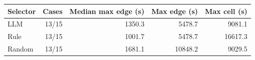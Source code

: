 \begin{tabular}{lrrrr}
\toprule
Selector & Cases & Median max edge (s) & Max edge (s) & Max cell (s) \\
\midrule
LLM & 13/15 & 1350.3 & 5478.7 & 9081.1 \\
Rule & 13/15 & 1001.7 & 5478.7 & 16617.3 \\
Random & 13/15 & 1681.1 & 10848.2 & 9029.5 \\
\bottomrule
\end{tabular}
